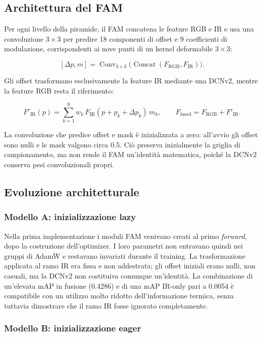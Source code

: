 \documentclass[a4paper,11pt]{article}
\begin{document}
\subsection{Architettura del FAM}

Per ogni livello della piramide, il FAM concatena le feature RGB e IR e usa una convoluzione $3\times3$ per predire 18 componenti di offset e 9 coefficienti di modulazione, corrispondenti ai nove punti di un kernel deformabile $3\times3$:

\[
[\Delta p,m]=\operatorname{Conv}_{3\times3}
    \bigl(\operatorname{Concat}(F_{\mathrm{RGB}},F_{\mathrm{IR}})\bigr).
\]

Gli offset trasformano esclusivamente la feature IR mediante una DCNv2, mentre la feature RGB resta il riferimento:

\[
F'_{\mathrm{IR}}(p)=
\sum_{k=1}^{9}w_k\,F_{\mathrm{IR}}(p+p_k+\Delta p_k)\,m_k,
\qquad
F_{\mathrm{fused}}=F_{\mathrm{RGB}}+F'_{\mathrm{IR}}.
\]

La convoluzione che predice offset e mask è inizializzata a zero: all'avvio gli offset sono nulli e le mask valgono circa 0.5. Ciò preserva inizialmente la griglia di campionamento, ma non rende il FAM un'identità matematica, poiché la DCNv2 conserva pesi convoluzionali propri.

\subsection{Evoluzione architetturale}

\subsubsection{Modello A: inizializzazione lazy}

Nella prima implementazione i moduli FAM venivano creati al primo \textit{forward}, dopo la costruzione dell'optimizer. I loro parametri non entravano quindi nei gruppi di AdamW e restavano invariati durante il training. La trasformazione applicata al ramo IR era fissa e non addestrata; gli offset iniziali erano nulli, non casuali, ma la DCNv2 non costituiva comunque un'identità. La combinazione di un'elevata mAP in fusione (0.4286) e di una mAP IR-only pari a 0.0054 è compatibile con un utilizzo molto ridotto dell'informazione termica, senza tuttavia dimostrare che il ramo IR fosse ignorato completamente.

\subsubsection{Modello B: inizializzazione eager}
\end{document}
